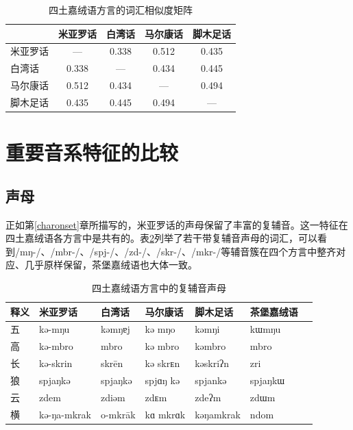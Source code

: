 \begin{table}[H]
\vspace{5pt}
    \centering
    \caption{四土嘉绒语方言的词汇相似度矩阵}
    \label{simmatrix}
\begin{tabular}{lcccc}
\toprule
       & 米亚罗话 & 白湾话 & 马尔康话 & 脚木足话 \\
\midrule
米亚罗话 & ---   & 0.338 & 0.512 & 0.435 \\
白湾话   & 0.338 & ---   & 0.434 & 0.445 \\
马尔康话 & 0.512 & 0.434 & ---   & 0.494 \\
脚木足话 & 0.435 & 0.445 & 0.494 & ---   \\
\bottomrule
\end{tabular}
\end{table}

\section{重要音系特征的比较}

\subsection{声母}

正如第\ref{charonset}章所描写的，米亚罗话的声母保留了丰富的复辅音。这一特征在四土嘉绒语各方言中是共有的。表\ref{clusterretention}列举了若干带复辅音声母的词汇，可以看到/mŋ-/、/mbr-/、/spj-/、/zd-/、/skr-/、/mkr-/等辅音簇在四个方言中整齐对应、几乎原样保留，茶堡嘉绒语也大体一致。

\begin{table}[H]
\vspace{5pt}
    \centering
    \caption{四土嘉绒语方言中的复辅音声母}
    \label{clusterretention}
\begin{tabular}{lllllll}
\toprule
释义 & 米亚罗话 & 白湾话 & 马尔康话 & 脚木足话 & 茶堡嘉绒语 \\
\midrule
五 & kə-mŋu      & kəmŋɐj    & kə mŋo    & kəmŋi      & kɯmŋu \\
高 & kə-mbro     & mbro      & kə mbro   & kəmbro     & mbro \\
长 & kə-skrin    & skrēn     & kə skrᴇn  & kəskriʔn   & zri \\
狼 & spjaŋkə     & spjaŋkə   & spjɑŋ kə  & spjankə    & spjaŋkɯ \\
云 & zdem        & zdiəm     & zdᴇm      & zdeʔm      & zdɯm \\
横 & kə-ŋa-mkrak & o-mkrāk   & kɑ mkrɑk  & kəŋamkrak  & ndom \\
\bottomrule
\end{tabular}
\end{table}

